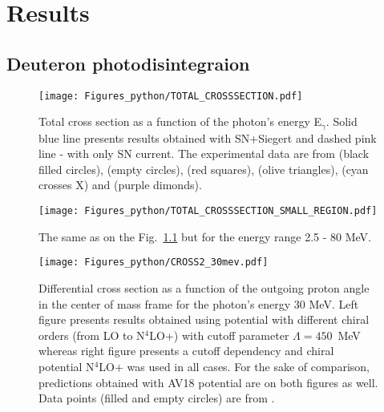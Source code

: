 \chapter{Results}

\section{Deuteron photodisintegraion}




    
    \begin{figure}[h]
        \begin{center}
        \texttt{[image: Figures\_python/TOTAL\_CROSSSECTION.pdf]}
        \end{center}
        \caption{Total cross section as a function of the photon's energy E$_\gamma$.
        Solid blue line presents results obtained with SN+Siegert 
        and dashed pink line - with only SN current.
        The experimental data are from \cite{Bernabei1986} (black filled circles),
        \cite{BOSMAN1979} (empty circles),
        \cite{ARENDS1984} (red squares),
        \cite{Skopik1974} (olive triangles),
        \cite{Moreh1989} (cyan crosses X) and
        \cite{Birenbaum1985} (purple dimonds).
        }
        \label{TOTAL_CROSS}
    \end{figure}
    

    \begin{figure}[h]
        \begin{center}
        \texttt{[image: Figures\_python/TOTAL\_CROSSSECTION\_SMALL\_REGION.pdf]}
        \end{center}
        \caption{The same as on the Fig.~\ref{TOTAL_CROSS} but for the energy range 2.5 - 80 MeV.
        }
        \label{TOTAL_CROSS_small}
    \end{figure}
        

    \begin{figure}[h]
        \begin{center}
        \texttt{[image: Figures\_python/CROSS2\_30mev.pdf]}
        \end{center}
        \caption{Differential cross section as a function of the outgoing proton angle in the center of mass frame 
        for the photon's energy 30 MeV. Left figure presents results obtained using potential
        with different chiral orders (from LO to N$^4$LO+) with cutoff parameter $\Lambda=450$~MeV
        whereas right figure presents a cutoff dependency and chiral potential N$^4$LO+ was used in all cases.
        For the sake of comparison, predictions obtained with AV18 potential are on both figures as well.
        Data points (filled and empty circles) are from \cite{Ying_Experiment_Deut}.}
        \label{CROSS_30}
    \end{figure}
        

